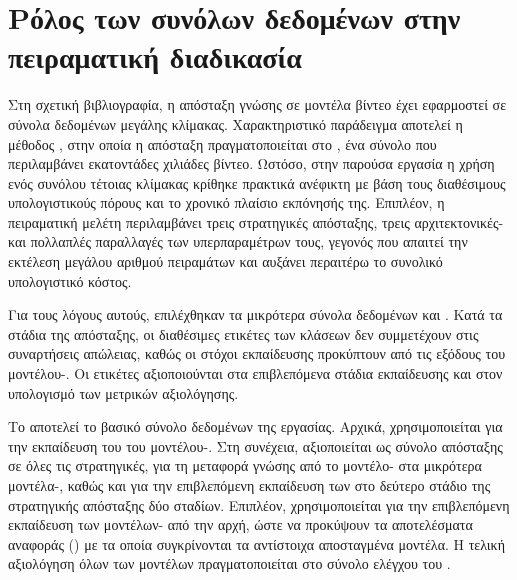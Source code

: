 \section{Ρόλος των συνόλων δεδομένων στην πειραματική διαδικασία}
\label{sec:dataset-usage}

Στη σχετική βιβλιογραφία, η απόσταξη γνώσης σε μοντέλα βίντεο έχει
εφαρμοστεί σε σύνολα δεδομένων μεγάλης κλίμακας. Χαρακτηριστικό
παράδειγμα αποτελεί η μέθοδος  \cite{wang2023mvd}, στην οποία η
απόσταξη πραγματοποιείται στο 
\cite{kay2017kinetics}, ένα σύνολο που περιλαμβάνει εκατοντάδες χιλιάδες
βίντεο. Ωστόσο, στην παρούσα εργασία η χρήση ενός συνόλου τέτοιας
κλίμακας κρίθηκε πρακτικά ανέφικτη με βάση τους διαθέσιμους
υπολογιστικούς πόρους και το χρονικό πλαίσιο εκπόνησής της. Επιπλέον, η
πειραματική μελέτη περιλαμβάνει τρεις στρατηγικές απόσταξης, τρεις
αρχιτεκτονικές- και πολλαπλές παραλλαγές των
υπερπαραμέτρων τους, γεγονός που απαιτεί την εκτέλεση μεγάλου αριθμού
πειραμάτων και αυξάνει περαιτέρω το συνολικό υπολογιστικό κόστος.

Για τους λόγους αυτούς, επιλέχθηκαν τα μικρότερα σύνολα δεδομένων
 και . Κατά τα στάδια της απόσταξης, οι διαθέσιμες
ετικέτες των κλάσεων δεν συμμετέχουν στις συναρτήσεις απώλειας, καθώς οι
στόχοι εκπαίδευσης προκύπτουν από τις εξόδους του
μοντέλου-. Οι ετικέτες αξιοποιούνται στα επιβλεπόμενα στάδια
εκπαίδευσης και στον υπολογισμό των μετρικών αξιολόγησης.

Το  αποτελεί το βασικό σύνολο δεδομένων της εργασίας. Αρχικά,
χρησιμοποιείται για την εκπαίδευση του  του
μοντέλου-. Στη συνέχεια, αξιοποιείται ως σύνολο απόσταξης
σε όλες τις στρατηγικές, για τη μεταφορά γνώσης από το
μοντέλο- στα μικρότερα μοντέλα-, καθώς και για
την επιβλεπόμενη εκπαίδευση των  στο δεύτερο
στάδιο της στρατηγικής απόσταξης δύο σταδίων.
Επιπλέον, χρησιμοποιείται για την επιβλεπόμενη εκπαίδευση των
μοντέλων- από την αρχή, ώστε να προκύψουν τα αποτελέσματα
αναφοράς () με τα οποία συγκρίνονται τα
αντίστοιχα αποσταγμένα μοντέλα. Η τελική αξιολόγηση όλων των μοντέλων
πραγματοποιείται στο σύνολο ελέγχου του .

